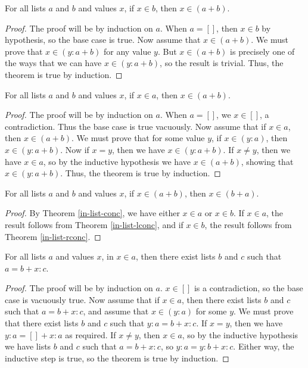 \documentclass[../math.tex]{subfiles}
\begin{document}
\begin{theorem} \label{in-list-rconc}
    For all lists $a$ and $b$ and values $x$, if $x \in b$, then $x \in (a +
    b)$.
\end{theorem}
\begin{proof}
    The proof will be by induction on $a$.  When $a = []$, then $x \in b$ by
    hypothesis, so the base case is true.  Now assume that $x \in (a + b)$.  We
    must prove that $x \in (y : a + b)$ for any value $y$.  But $x \in (a + b)$
    is precisely one of the ways that we can have $x \in (y : a + b)$, so the
    result is trivial.  Thus, the theorem is true by induction.
\end{proof}

\begin{theorem} \label{in-list-lconc}
    For all lists $a$ and $b$ and values $x$, if $x \in a$, then $x \in (a +
    b)$.
\end{theorem}
\begin{proof}
    The proof will be by induction on $a$.  When $a = []$, we $x \in []$, a
    contradiction.  Thus the base case is true vacuously.  Now assume that if $x
    \in a$, then $x \in (a + b)$.  We must prove that for some value $y$, if $x
    \in (y : a)$, then $x \in (y : a + b)$.  Now if $x = y$, then we have $x \in
    (y : a + b)$.  If $x \neq y$, then we have $x \in a$, so by the inductive
    hypothesis we have $x \in (a + b)$, showing that $x \in (y : a + b)$.  Thus,
    the theorem is true by induction.
\end{proof}

\begin{theorem} \label{in-list-comm}
    For all lists $a$ and $b$ and values $x$, if $x \in (a + b)$, then $x \in (b
    + a)$.
\end{theorem}
\begin{proof}
    By Theorem \ref{in-list-conc}, we have either $x \in a$ or $x \in b$.  If $x
    \in a$, the result follows from Theorem \ref{in-list-lconc}, and if $x \in
    b$, the result follows from Theorem \ref{in-list-rconc}.
\end{proof}

\begin{theorem} \label{in-list-split}
    For all lists $a$ and values $x$, in $x \in a$, then there exist lists $b$
    and $c$ such that $a = b + x : c$.
\end{theorem}
\begin{proof}
    The proof will be by induction on $a$.  $x \in []$ is a contradiction, so
    the base case is vacuously true.  Now assume that if $x \in a$, then there
    exist lists $b$ and $c$ such that $a = b + x : c$, and assume that $x \in
    (y : a)$ for some $y$.  We must prove that there exist lists $b$ and $c$
    such that $y : a = b + x : c$.  If $x = y$, then we have $y : a = [] + x :
    a$ as required.  If $x \neq y$, then $x \in a$, so by the inductive
    hypothesis we have lists $b$ and $c$ such that $a = b + x : c$, so $y : a
    = y : b + x : c$.  Either way, the inductive step is true, so the theorem is
    true by induction.
\end{proof}
\end{document}
